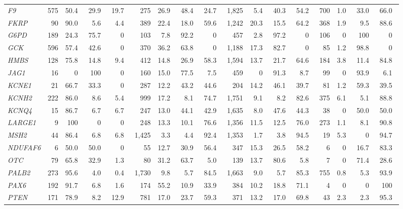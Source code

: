 \documentclass[11pt]{article}
\theoremstyle{plain}
\begin{document}
\begin{table}[!htb]
{{\begin{tabular}{@{}l rrrr rrrr rrrr rrrr@{}}
\textit{F9} & 575 & 50.4\ & 29.9\ & 19.7\ & 275 & 26.9\ & 48.4\ & 24.7\ & 1,825 & 5.4\ & 40.3\ & 54.2\ & 700 & 1.0\ & 33.0\ & 66.0\ \\
\textit{FKRP} & 90 & 90.0\ & 5.6\ & 4.4\ & 389 & 22.4\ & 18.0\ & 59.6\ & 1,242 & 20.3\ & 15.5\ & 64.2\ & 368 & 1.9\ & 9.5\ & 88.6\ \\
\textit{G6PD} & 189 & 24.3\ & 75.7\ & 0\ & 103 & 7.8\ & 92.2\ & 0\ & 457 & 2.8\ & 97.2\ & 0\ & 106 & 0\ & 100\ & 0\ \\
\textit{GCK} & 596 & 57.4\ & 42.6\ & 0\ & 370 & 36.2\ & 63.8\ & 0\ & 1,188 & 17.3\ & 82.7\ & 0\ & 85 & 1.2\ & 98.8\ & 0\ \\
\textit{HMBS} & 128 & 75.8\ & 14.8\ & 9.4\ & 412 & 14.8\ & 26.9\ & 58.3\ & 1,594 & 13.7\ & 21.7\ & 64.6\ & 184 & 3.8\ & 11.4\ & 84.8\ \\
\textit{JAG1} & 16 & 0\ & 100\ & 0\ & 160 & 15.0\ & 77.5\ & 7.5\ & 459 & 0\ & 91.3\ & 8.7\ & 99 & 0\ & 93.9\ & 6.1\ \\
\textit{KCNE1} & 21 & 66.7\ & 33.3\ & 0\ & 287 & 12.2\ & 43.2\ & 44.6\ & 204 & 14.2\ & 46.1\ & 39.7\ & 81 & 1.2\ & 59.3\ & 39.5\ \\
\textit{KCNH2} & 222 & 86.0\ & 8.6\ & 5.4\ & 999 & 17.2\ & 8.1\ & 74.7\ & 1,751 & 9.1\ & 8.2\ & 82.6\ & 375 & 6.1\ & 5.1\ & 88.8\ \\
\textit{KCNQ4} & 15 & 86.7\ & 6.7\ & 6.7\ & 247 & 13.0\ & 44.1\ & 42.9\ & 1,635 & 8.0\ & 47.6\ & 44.3\ & 38 & 0\ & 50.0\ & 50.0\ \\
\textit{LARGE1} & 9 & 100\ & 0\ & 0\ & 248 & 13.3\ & 10.1\ & 76.6\ & 1,356 & 11.5\ & 12.5\ & 76.0\ & 273 & 1.1\ & 8.1\ & 90.8\ \\
\textit{MSH2} & 44 & 86.4\ & 6.8\ & 6.8\ & 1,425 & 3.3\ & 4.4\ & 92.4\ & 1,353 & 1.7\ & 3.8\ & 94.5\ & 19 & 5.3\ & 0\ & 94.7\ \\
\textit{NDUFAF6} & 6 & 50.0\ & 50.0\ & 0\ & 55 & 12.7\ & 30.9\ & 56.4\ & 347 & 15.3\ & 26.5\ & 58.2\ & 6 & 0\ & 16.7\ & 83.3\ \\
\textit{OTC} & 79 & 65.8\ & 32.9\ & 1.3\ & 80 & 31.2\ & 63.7\ & 5.0\ & 139 & 13.7\ & 80.6\ & 5.8\ & 7 & 0\ & 71.4\ & 28.6\ \\
\textit{PALB2} & 273 & 95.6\ & 4.0\ & 0.4\ & 1,730 & 9.8\ & 5.7\ & 84.5\ & 1,663 & 9.0\ & 5.7\ & 85.3\ & 755 & 0.8\ & 5.3\ & 93.9\ \\
\textit{PAX6} & 192 & 91.7\ & 6.8\ & 1.6\ & 174 & 55.2\ & 10.9\ & 33.9\ & 384 & 10.2\ & 18.8\ & 71.1\ & 4 & 0\ & 0\ & 100\ \\
\textit{PTEN} & 171 & 78.9\ & 8.2\ & 12.9\ & 781 & 17.0\ & 23.7\ & 59.3\ & 371 & 13.2\ & 17.0\ & 69.8\ & 43 & 2.3\ & 2.3\ & 95.3\ \\

\end{tabular}}}
\end{table}
\end{document}

